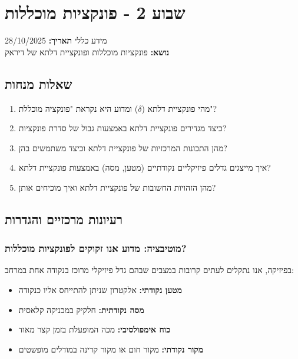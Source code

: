 \documentclass{article}
\begin{document}
\section{שבוע 2 - פונקציות מוכללות }

\begin{mainbox}{מידע כללי}
\textbf{תאריך:} 28/10/2025\\
\textbf{נושא:} פונקציות מוכללות ופונקציית דלתא של דיראק
\end{mainbox}

\subsection*{שאלות מנחות}

\begin{enumerate}[label=\textbf{\arabic*.}, rightmargin=2em, leftmargin=1em]
\item מהי פונקציית דלתא ($\delta$) ומדוע היא נקראת "פונקציה מוכללת"?
\item כיצד מגדירים פונקציית דלתא באמצעות גבול של סדרת פונקציות?
\item מהן התכונות המרכזיות של פונקציית דלתא וכיצד משתמשים בהן?
\item איך מייצגים גדלים פיזיקליים נקודתיים (מטען, מסה) באמצעות פונקציית דלתא?
\item מהן הזהויות החשובות של פונקציית דלתא ואיך מוכיחים אותן?
\end{enumerate}

\subsection*{רעיונות מרכזיים והגדרות}

\subsubsection*{מוטיבציה: מדוע אנו זקוקים לפונקציות מוכללות?}

בפיזיקה, אנו נתקלים לעתים קרובות במצבים שבהם גדל פיזיקלי מרוכז בנקודה אחת במרחב:
\begin{itemize}
\item \textbf{מטען נקודתי:} אלקטרון שניתן להתייחס אליו כנקודה
\item \textbf{מסה נקודתית:} חלקיק במכניקה קלאסית
\item \textbf{כוח אימפולסיבי:} מכה המופעלת בזמן קצר מאוד
\item \textbf{מקור נקודתי:} מקור חום או מקור קרינה במודלים מופשטים
\end{itemize}
\end{document}
